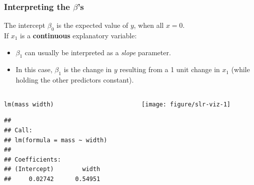 \documentclass[color=usenames,dvipsnames]{beamer}\usepackage[]{graphicx}\usepackage[]{xcolor}
\makeatletter
\newcommand{\hlopt}[1]{\textcolor[rgb]{0,0,0}{#1}}%
\newcommand{\hldef}[1]{\textcolor[rgb]{0,0,0}{#1}}%
\newcommand{\hlkwd}[1]{\textcolor[rgb]{0.004,0.004,0.506}{#1}}%
\newenvironment{kframe}{%
 \def\at@end@of@kframe{}%
 \ifinner\ifhmode%
  \def\at@end@of@kframe{\end{minipage}}%
  \begin{minipage}{\columnwidth}%
 \fi\fi%
 \def\FrameCommand##1{\hskip\@totalleftmargin \hskip-\fboxsep
 \colorbox{shadecolor}{##1}\hskip-\fboxsep
     \hskip-\linewidth \hskip-\@totalleftmargin \hskip\columnwidth}%
 \MakeFramed {\advance\hsize-\width
   \@totalleftmargin\z@ \linewidth\hsize
   \@setminipage}}%
 {\par\unskip\endMakeFramed%
 \at@end@of@kframe}
\newenvironment{knitrout}{}{} %
\makeatother
\begin{document}
\begin{frame}[fragile]
  \frametitle{Interpreting the $\beta$'s}
  \small 
  The intercept $\beta_0$ is the expected value of $y$, when all $x=0$. \\
  \pause
  \vfill
  If $x_1$ is a {\bf continuous} explanatory variable: %
  \begin{itemize}
    \item $\beta_1$ can usually be interpreted as a \textit{slope}
      parameter.
    \item In this case, $\beta_1$ is the
      change in $y$ resulting from a 1 unit change in $x_1$ (while
      holding the other predictors constant).
  \end{itemize}
\pause
\vfill
\centering
\begin{columns}
  \begin{column}{0.5\textwidth}
\begin{knitrout}\tiny
{}\color{fgcolor}\begin{kframe}
\begin{alltt}
\hlkwd{lm}\hldef{(mass}\hlopt{~}\hldef{width)}
\end{alltt}
\begin{verbatim}
## 
## Call:
## lm(formula = mass ~ width)
## 
## Coefficients:
## (Intercept)        width  
##     0.02742      0.54951
\end{verbatim}
\end{kframe}
\end{knitrout}
  \end{column}
  \begin{column}{0.4\textwidth}
  \texttt{[image: figure/slr-viz-1]} \\
  \end{column}
\end{columns}
\end{frame}
\end{document}
